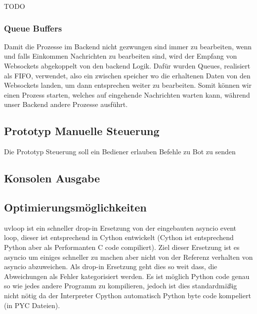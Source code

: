 TODO

\subsubsection{Queue Buffers}
Damit die Prozesse im Backend nicht gezwungen sind immer zu bearbeiten, 
wenn und falls Einkommen Nachrichten zu bearbeiten sind, 
wird der Empfang von Websockets abgekoppelt von den backend Logik.
Dafür wurden Queues, realisiert als FIFO, verwendet, also ein zwischen speicher 
wo die erhaltenen Daten von den Websockets landen, um dann entsprechen weiter zu bearbeiten.
Somit können wir einen Prozess starten, welches auf eingehende Nachrichten warten kann, 
während unser Backend andere Prozesse ausführt.

\subsection{Prototyp Manuelle Steuerung}
Die Prototyp Steuerung soll ein Bediener erlauben Befehle zu Bot zu senden

\subsection{Konsolen Ausgabe}

\subsection{Optimierungsmöglichkeiten}
\label{subsec:Optimierungsmöglichkeiten}
uvloop ist ein schneller drop-in Ersetzung von der eingebauten asyncio event loop, 
dieser ist entsprechend in Cython entwickelt (Cython ist entsprechend Python aber als Performanten C code compiliert).
Ziel dieser Ersetzung ist es asyncio um einiges schneller zu machen aber nicht von der Referenz verhalten von asyncio abzuweichen. 
Als drop-in Ersetzung geht dies so weit dass, die Abweichungen als Fehler kategorisiert werden.
Es ist möglich Python code genau so wie jedes andere Programm zu kompilieren,
jedoch ist dies standardmäßig nicht nötig da der Interpreter Cpython automatisch Python byte code kompeliert (in PYC Dateien).

